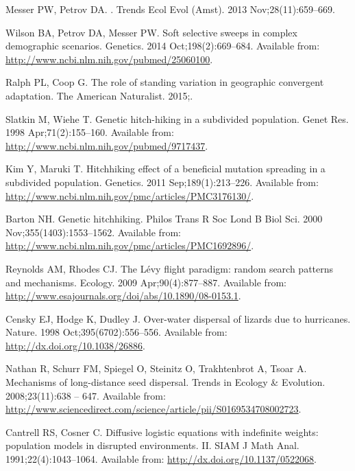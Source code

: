 \documentclass[10pt,letterpaper]{article}
\begin{document}
\begin{thebibliography}{10}
Messer PW, Petrov DA.
.
\newblock Trends Ecol Evol (Amst). 2013 Nov;28(11):659--669.

Wilson BA, Petrov DA, Messer PW.
\newblock Soft selective sweeps in complex demographic scenarios.
\newblock Genetics. 2014 Oct;198(2):669--684.
\newblock Available from: \url{http://www.ncbi.nlm.nih.gov/pubmed/25060100}.

Ralph PL, Coop G.
\newblock The role of standing variation in geographic convergent adaptation.
\newblock The American Naturalist. 2015;.

Slatkin M, Wiehe T.
\newblock Genetic hitch-hiking in a subdivided population.
\newblock Genet Res. 1998 Apr;71(2):155--160.
\newblock Available from: \url{http://www.ncbi.nlm.nih.gov/pubmed/9717437}.

Kim Y, Maruki T.
\newblock Hitchhiking effect of a beneficial mutation spreading in a subdivided
  population.
\newblock Genetics. 2011 Sep;189(1):213--226.
\newblock Available from:
  \url{http://www.ncbi.nlm.nih.gov/pmc/articles/PMC3176130/}.

Barton NH.
\newblock Genetic hitchhiking.
\newblock Philos Trans R Soc Lond B Biol Sci. 2000 Nov;355(1403):1553--1562.
\newblock Available from:
  \url{http://www.ncbi.nlm.nih.gov/pmc/articles/PMC1692896/}.

Reynolds AM, Rhodes CJ.
\newblock The {L{é}vy} flight paradigm: random search patterns and mechanisms.
\newblock Ecology. 2009 Apr;90(4):877--887.
\newblock Available from:
  \url{http://www.esajournals.org/doi/abs/10.1890/08-0153.1}.

Censky EJ, Hodge K, Dudley J.
\newblock Over-water dispersal of lizards due to hurricanes.
\newblock Nature. 1998 Oct;395(6702):556--556.
\newblock Available from: \url{http://dx.doi.org/10.1038/26886}.

Nathan R, Schurr FM, Spiegel O, Steinitz O, Trakhtenbrot A, Tsoar A.
\newblock Mechanisms of long-distance seed dispersal.
\newblock Trends in Ecology \& Evolution. 2008;23(11):638 -- 647.
\newblock Available from:
  \url{http://www.sciencedirect.com/science/article/pii/S0169534708002723}.

Cantrell RS, Cosner C.
\newblock Diffusive logistic equations with indefinite weights: population
  models in disrupted environments. {II}.
\newblock SIAM J Math Anal. 1991;22(4):1043--1064.
\newblock Available from: \url{http://dx.doi.org/10.1137/0522068}.


\end{thebibliography}
\end{document}
